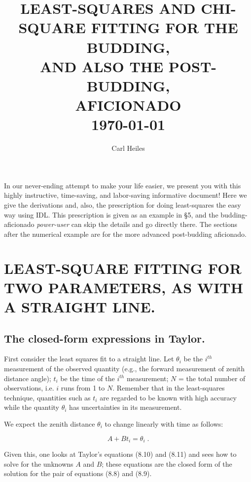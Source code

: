 

\title{LEAST-SQUARES AND CHI-SQUARE FITTING FOR THE BUDDING, \\ 
AND ALSO THE POST-BUDDING, \\ AFICIONADO \\ \today} 

\author{Carl Heiles}

	In our never-ending attempt to make your life easier, we present
you with this highly instructive, time-saving, and labor-saving
informative document! Here we give the derivations and, also, the
prescription for doing least-squares the easy way using IDL.  This
prescription is given as an example in \S 5, and the budding-aficionado
{\it power-user} can skip the details and go directly there.  The
sections after the numerical example are for the more advanced
post-budding aficionado. 

\section{LEAST-SQUARE FITTING FOR TWO PARAMETERS, AS WITH A STRAIGHT
LINE.}

\subsection{The closed-form expressions in Taylor.}

	First consider the least squares fit to a straight line.  Let
$\theta_i$ be the $i^{th}$ measurement of the observed quantity (e.g.,
the forward measurement of zenith distance angle); $t_i$ be the time of
the $i^{th}$ measurement; $N$ = the total number of observations, i.e. 
$i$ runs from 1 to $N$.  Remember that in the least-squares technique,
quantities such as $t_i$ are regarded to be known with high accuracy
while the quantity $\theta_i$ has uncertainties in its measurement. 

	We expect the zenith distance $\theta_i$ to change linearly with
time as follows:

\begin{equation}
\label{basicone}
A + B t_i = \theta_i \; .
\end{equation}

\noindent Given this, one looks at Taylor's equations (8.10) and (8.11)
and sees how to solve for the unknowns $A$ and $B$; these equations are
the closed form of the solution for the pair of equations (8.8) and
(8.9). 

